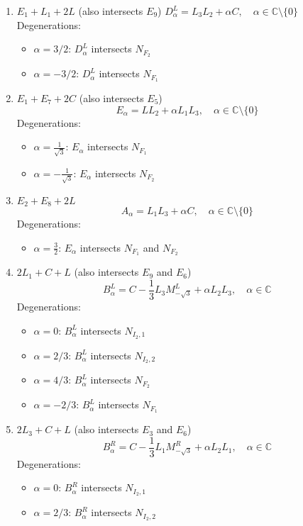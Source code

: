 \documentclass{article}
\newcommand{\C}{\mathbb{C}}
\begin{document}
\begin{enumerate}
  \item $E_1 + L_1 + 2L$ (also intersects $E_9$)
  $D_{\alpha}^L = L_3L_2 + \alpha C, \quad \alpha \in \C \setminus\{0\}$
  Degenerations:
  \begin{itemize}
      \item $\alpha = 3/2$: $D_{\alpha}^L$ intersects $N_{F_2}$
      \item $\alpha = -3/2$: $D_{\alpha}^L$ intersects $N_{F_1}$
  \end{itemize}
  \item $E_1 + E_7 + 2C$ (also intersects $E_5$)
  \[E_\alpha = LL_2 + \alpha L_1L_3, \quad \alpha \in \C \setminus\{0\}\]
  Degenerations:
  \begin{itemize}
      \item $\alpha = \frac{1}{\sqrt{3}}$: $E_{\alpha}$ intersects $N_{F_1}$
      \item $\alpha = -\frac{1}{\sqrt{3}}$: $E_{\alpha}$ intersects $N_{F_2}$
  \end{itemize}
  \item $E_2 + E_8 + 2L$
  \[A_\alpha = L_1L_3 + \alpha C, \quad \alpha \in \C \setminus\{0\}\]
  Degenerations:
  \begin{itemize}
      \item $\alpha = \frac{3}{2}$: $E_{\alpha}$ intersects $N_{F_1}$ and $N_{F_2}$
  \end{itemize}
  \item $2L_1 + C + L$ (also intersects $E_9$ and $E_6$)
  \[B_\alpha^L = C - \frac{1}{3}L_3M_{-\sqrt{3}}^L + \alpha L_2 L_3, \quad \alpha \in \C\]
  Degenerations:
  \begin{itemize}
      \item $\alpha = 0$: $B_\alpha^L$ intersects $N_{I_2,1}$
      \item $\alpha = 2/3$: $B_\alpha^L$ intersects $N_{I_2,2}$
      \item $\alpha = 4/3$: $B_\alpha^L$ intersects $N_{F_2}$
      \item $\alpha = -2/3$: $B_\alpha^L$ intersects $N_{F_1}$
  \end{itemize}
  \item $2L_3 + C + L$ (also intersects $E_3$ and $E_6$)
  \[B_\alpha^R = C - \frac{1}{3}L_1M_{-\sqrt{3}}^R + \alpha L_2 L_1, \quad \alpha \in \C\]
  Degenerations:
  \begin{itemize}
      \item $\alpha = 0$: $B_\alpha^R$ intersects $N_{I_2,1}$
      \item $\alpha = 2/3$: $B_\alpha^R$ intersects $N_{I_2,2}$

\end{itemize}
\end{enumerate}
\end{document}
